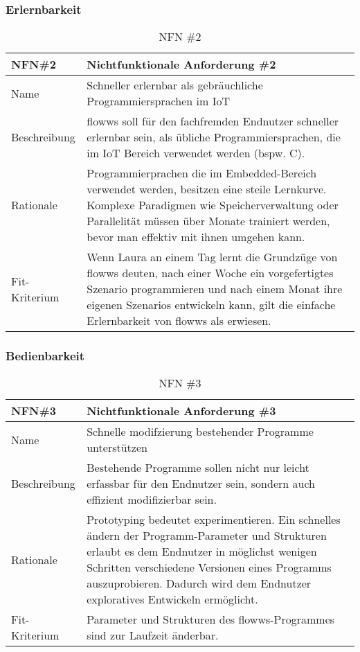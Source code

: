 \subsubsection{Erlernbarkeit}
\begin{table}[H]
\caption{NFN \#2}
\label{tab:nfn2}
\begin{tabularx}{\textwidth}{lX}
\hline
\rowcolor[HTML]{EFEFEF} 
NFN\#2        & Nichtfunktionale Anforderung \#2 \\ \hline
Name          & Schneller erlernbar als gebräuchliche Programmiersprachen im \ac{IoT} \\ \hline
Beschreibung  & flowws soll für den fachfremden Endnutzer schneller erlernbar sein, als übliche Programmiersprachen, die im IoT Bereich verwendet werden (bspw. C).\\ \hline
Rationale     & Programmierprachen die im Embedded-Bereich verwendet werden, besitzen eine steile Lernkurve. Komplexe Paradigmen wie Speicherverwaltung oder Parallelität müssen über Monate trainiert werden, bevor man effektiv mit ihnen umgehen kann. \\ \hline
Fit-Kriterium & Wenn Laura an einem Tag lernt die Grundzüge von flowws deuten, nach einer Woche ein vorgefertigtes Szenario programmieren und nach einem Monat ihre eigenen Szenarios entwickeln kann, gilt die einfache Erlernbarkeit von flowws als erwiesen. \\ \hline
\end{tabularx}
\end{table}

\subsubsection{Bedienbarkeit}
\begin{table}[H]
\caption{NFN \#3}
\label{tab:nfn3}
\begin{tabularx}{\textwidth}{lX}
\hline
\rowcolor[HTML]{EFEFEF} 
NFN\#3        & Nichtfunktionale Anforderung \#3 \\ \hline
Name          & Schnelle modifzierung bestehender Programme unterstützen \\ \hline
Beschreibung  & Bestehende Programme sollen nicht nur leicht erfassbar für den Endnutzer sein, sondern auch effizient modifizierbar sein. \\ \hline
Rationale     &  Prototyping bedeutet experimentieren. Ein schnelles ändern der Programm-Parameter und Strukturen erlaubt es dem Endnutzer in möglichst wenigen Schritten verschiedene Versionen eines Programms auszuprobieren. Dadurch wird dem Endnutzer exploratives Entwickeln ermöglicht.\\ \hline
Fit-Kriterium & Parameter und Strukturen des flowws-Programmes sind zur Laufzeit änderbar. \\ \hline 
\end{tabularx}
\end{table}

